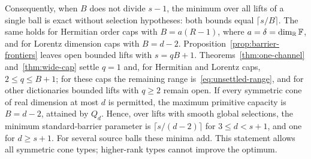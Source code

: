 Consequently, when $B$ does not divide $s-1$, the minimum over all lifts
of a single ball is exact without selection hypotheses: both bounds
equal $\lceil s/B\rceil$. The same holds for Hermitian order caps with
$B=a(R-1)$, where $a=\delta=\dim_\mathbb R\mathbb F$, and for Lorentz
dimension caps with $B=d-2$.
Proposition~\ref{prop:barrier-frontiers} leaves open bounded lifts with
$s=qB+1$. Theorems~\ref{thm:one-channel} and~\ref{thm:wide-cap} settle
$q=1$ and, for Hermitian and Lorentz caps, $2\leq q\leq B+1$; for
these caps the remaining range is~\eqref{eq:unsettled-range}, and for
other dictionaries bounded lifts with $q\geq2$ remain open.
If every symmetric cone of real dimension at most $d$ is permitted, the
maximum primitive capacity is $B=d-2$, attained by $Q_d$. Hence, over
lifts with smooth global selections, the minimum standard-barrier
parameter is $\lceil s/(d-2)\rceil$ for $3\leq d<s+1$, and one for
$d\geq s+1$. For several source balls these minima add. This
statement allows all symmetric cone types; higher-rank types cannot
improve the optimum.

